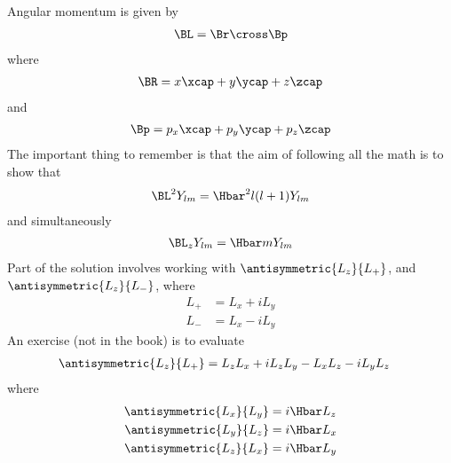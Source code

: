 Angular momentum is given by
%
\begin{equation}\label{eqn:lecture5BigReviewAngularMomentum:5240}
\begin{aligned}
\BL = \Br \cross \Bp
\end{aligned}
\end{equation}
%
where
%
\begin{equation}\label{eqn:lecture5BigReviewAngularMomentum:5260}
\begin{aligned}
\BR = x \xcap + y\ycap + z\zcap
\end{aligned}
\end{equation}
%
and
\begin{equation}\label{eqn:lecture5BigReviewAngularMomentum:5280}
\begin{aligned}
\Bp = p_x \xcap + p_y\ycap + p_z\zcap
\end{aligned}
\end{equation}
%
The important thing to remember is that the aim of following all the math is to show that
%
\begin{equation}\label{eqn:lecture5BigReviewAngularMomentum:5300}
\begin{aligned}
\BL^2 Y_{lm} = \Hbar^2 l (l+1) Y_{lm}
\end{aligned}
\end{equation}
%
and simultaneously
%
\begin{equation}\label{eqn:lecture5BigReviewAngularMomentum:5320}
\begin{aligned}
\BL_z Y_{lm} = \Hbar m Y_{lm}
\end{aligned}
\end{equation}
%
Part of the solution involves working with \(\antisymmetric{L_z}{L_{+}}\), and \(\antisymmetric{L_z}{L_{-}}\), where
%
\begin{equation}\label{eqn:lecture5BigReviewAngularMomentum:5340}
\begin{aligned}
L_{+} &= L_x + i L_y \\
L_{-} &= L_x - i L_y
\end{aligned}
\end{equation}
%
An exercise (not in the book) is to evaluate
\begin{equation}\label{eqn:PHY356F:4000}
\begin{aligned}
\antisymmetric{L_z}{L_{+}}
&= L_z L_x + i L_z L_y - L_x L_z - i L_y L_z
\end{aligned}
\end{equation}
%
where
\begin{equation}\label{eqn:PHY356F:5000}
\begin{aligned}
\antisymmetric{L_x}{L_y}  &= i \Hbar L_z \\
\antisymmetric{L_y}{L_z}  &= i \Hbar L_x \\
\antisymmetric{L_z}{L_x}  &= i \Hbar L_y
\end{aligned}
\end{equation}
